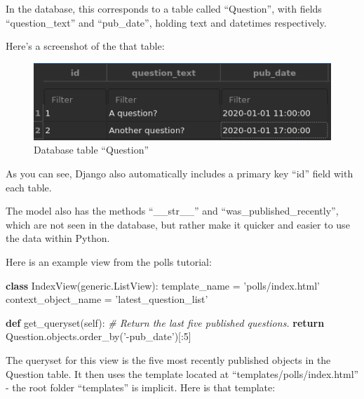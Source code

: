 \documentclass[]{article}
\newenvironment{Shaded}{}{}
\newcommand{\CommentTok}[1]{\textcolor[rgb]{0.38,0.63,0.69}{\textit{#1}}}
\newcommand{\ControlFlowTok}[1]{\textcolor[rgb]{0.00,0.44,0.13}{\textbf{#1}}}
\newcommand{\DecValTok}[1]{\textcolor[rgb]{0.25,0.63,0.44}{#1}}
\newcommand{\KeywordTok}[1]{\textcolor[rgb]{0.00,0.44,0.13}{\textbf{#1}}}
\newcommand{\NormalTok}[1]{#1}
\newcommand{\OperatorTok}[1]{\textcolor[rgb]{0.40,0.40,0.40}{#1}}
\newcommand{\OtherTok}[1]{\textcolor[rgb]{0.00,0.44,0.13}{#1}}
\newcommand{\StringTok}[1]{\textcolor[rgb]{0.25,0.44,0.63}{#1}}
\newcommand{\VariableTok}[1]{\textcolor[rgb]{0.10,0.09,0.49}{#1}}
\begin{document}
In the database, this corresponds to a table called ``Question'', with
fields ``question\_text'' and ``pub\_date'', holding text and datetimes
respectively.

Here's a screenshot of the that table:

\begin{figure}
\hypertarget{fig:database1}{%
\centering
\includegraphics{./tex2pdf.-ae8b3c0afe160db8/d7e757a2f711477f461b1e6dc054f607adf6010c.png}
\caption{Database table ``Question''{}}\label{fig:database1}
}
\end{figure}

As you can see, Django also automatically includes a primary key ``id''
field with each table.

The model also has the methods ``\_\_str\_\_'' and
``was\_published\_recently'', which are not seen in the database, but
rather make it quicker and easier to use the data within Python.

Here is an example view from the polls tutorial:

\begin{Shaded}
\begin{Highlighting}[]
\KeywordTok{class}\NormalTok{ IndexView(generic.ListView):}
\NormalTok{    template_name }\OperatorTok{=} \StringTok{'polls/index.html'}
\NormalTok{    context_object_name }\OperatorTok{=} \StringTok{'latest_question_list'}

    \KeywordTok{def}\NormalTok{ get_queryset(}\VariableTok{self}\NormalTok{):}
        \CommentTok{# Return the last five published questions.}
        \ControlFlowTok{return}\NormalTok{ Question.objects.order_by(}\StringTok{'-pub_date'}\NormalTok{)[:}\DecValTok{5}\NormalTok{]}
\end{Highlighting}
\end{Shaded}

The queryset for this view is the five most recently published objects
in the Question table. It then uses the template located at
``templates/polls/index.html'' - the root folder ``templates'' is
implicit. Here is that template:

\begin{Shaded}
\end{Shaded}
\end{document}
